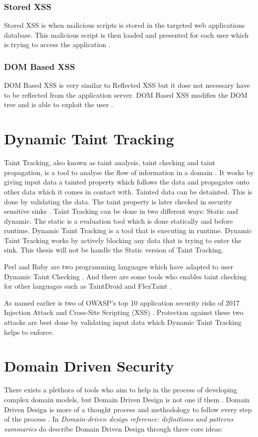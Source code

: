 \subsubsection{Stored XSS}
Stored XSS is when malicious scripts is stored in the targeted web applications database. This malicious script is then loaded and presented for each user which is trying to access the application \parencite{Secure_Web}.


\subsubsection{DOM Based XSS}
DOM Based XSS is very similar to Reflected XSS but it dose not necessary have to be reflected from the application server. DOM Based XSS modifies the DOM tree and is able to exploit the user \parencite{Secure_Web}.


\section{Dynamic Taint Tracking}
Taint Tracking, also known as taint analysis, taint checking and taint propagation, is a tool to analyse the flow of information in a domain \parencite{Pan2015}. It works by giving input data a tainted property which follows the data and propagates onto other data which it comes in contact with. Tainted data can be detainted. This is done by validating the data. The taint property is later checked in security sensitive sinks \parencite{Pan2015}. Taint Tracking can be done in two different ways: Static and dynamic. The static is a evaluation tool which is done statically and before runtime. Dynamic Taint Tracking is a tool that is executing in runtime. Dynamic Taint Tracking works by actively blocking any data that is trying to enter the sink. This thesis will not be handle the Static version of Taint Tracking. 

Perl and Ruby are two programming languages which have adapted to user Dynamic Taint Checking \parencite{perl, ruby}. And there are some tools who enables taint checking for other languages such as TaintDroid \parencite{Ma2010} and FlexTaint \parencite{Venkataramani2008}.

As named earlier is two of OWASP's top 10 application security risks of 2017 Injection Attack and Cross-Site Scripting (XSS) \parencite{OWASP2017}. Protection against these two attacks are best done by validating input data which Dynamic Taint Tracking helps to enforce.


\section{Domain Driven Security}
There exists a plethora of tools who aim to help in the process of developing complex domain models, but Domain Driven Design is not one if them \parencite{Bankes, 10.1007/978-3-319-24309-2_33}. Domain Driven Design is more of a thought process and methodology to follow every step of the process \parencite{EvansEric2004Dd:t}. In \emph{Domain-driven design reference: definitions and patterns summaries} do \textcite{evans_2015} describe Domain Driven Design through three core ideas:

